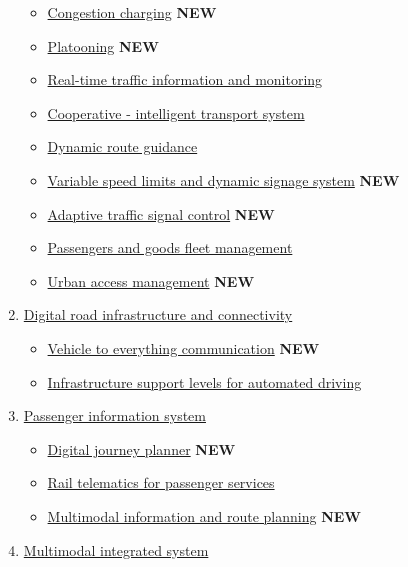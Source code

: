 \documentclass[
]{book}
\providecommand{\tightlist}{%
  \setlength{\itemsep}{0pt}\setlength{\parskip}{0pt}}
\begin{document}
\begin{enumerate}
  \begin{itemize}
  \tightlist
  \item
    \protect\hyperlink{congestion_charging}{Congestion charging} \textbf{NEW}
  \item
    \protect\hyperlink{platooning}{Platooning} \textbf{NEW}
  \item
    \protect\hyperlink{traffic_info_monitoring}{Real-time traffic information and monitoring}
  \item
    \protect\hyperlink{cits}{Cooperative - intelligent transport system}
  \item
    \protect\hyperlink{dynamic_route}{Dynamic route guidance}
  \item
    \protect\hyperlink{variable_speed}{Variable speed limits and dynamic signage system} \textbf{NEW}
  \item
    \protect\hyperlink{adaptive_traffic_control}{Adaptive traffic signal control} \textbf{NEW}
  \item
    \protect\hyperlink{p_g_fleet_management}{Passengers and goods fleet management}
  \item
    \protect\hyperlink{urban_access}{Urban access management} \textbf{NEW}
  \end{itemize}
\item
  \protect\hyperlink{digital}{Digital road infrastructure and connectivity}

  \begin{itemize}
  \tightlist
  \item
    \protect\hyperlink{v2x}{Vehicle to everything communication} \textbf{NEW}
  \item
    \protect\hyperlink{infrast_support_level}{Infrastructure support levels for automated driving}
  \end{itemize}
\item
  \protect\hyperlink{passenger}{Passenger information system}

  \begin{itemize}
  \tightlist
  \item
    \protect\hyperlink{djp}{Digital journey planner} \textbf{NEW}
  \item
    \protect\hyperlink{telematics_passenger}{Rail telematics for passenger services}
  \item
    \protect\hyperlink{info_and_route_planning}{Multimodal information and route planning} \textbf{NEW}
  \end{itemize}
\item
  \protect\hyperlink{multimodal}{Multimodal integrated system}


\end{enumerate}
\end{document}
